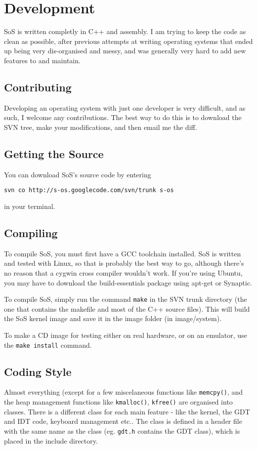 \chapter{Development}
SoS is written completly in C++ and assembly. I am trying to keep the code as clean as possible, after
previous attempts at writing operating systems that ended up being very dis-organised and messy, and was
generally very hard to add new features to and maintain.

\section{Contributing}
Developing an operating system with just one developer is very difficult, and as such, I welcome any
contributions. The best way to do this is to download the SVN tree, make your modifications, and then
email me the diff.

\section{Getting the Source}
You can download SoS's source code by entering 
\begin{verbatim}svn co http://s-os.googlecode.com/svn/trunk s-os\end{verbatim}
 in your terminal.

\section{Compiling}
To compile SoS, you must first have a GCC toolchain installed. SoS is written and tested with Linux, so that
is probably the best way to go, although there's no reason that a cygwin cross compiler wouldn't work. If you're
using Ubuntu, you may have to download the build-essentials package using apt-get or Synaptic.

To compile SoS, simply run the command \texttt{make} in the SVN trunk directory (the one that contains the makefile
and most of the C++ source files). This will build the SoS kernel image and save it in the image folder (in image/system).

To make a CD image for testing either on real hardware, or on an emulator, use the \texttt{make install} command.

\section{Coding Style}
Almost everything (except for a few miscelaneous functions like \texttt{memcpy()}, and the heap management
functions like \texttt{kmalloc()}, \texttt{kfree()} are organised into classes. There is a different class
for each main feature - like the kernel, the GDT and IDT code, keyboard management etc.. The class is defined
in a header file with the same name as the class (eg.  \texttt{gdt.h} contains the  GDT class), which is placed
in the include directory.

